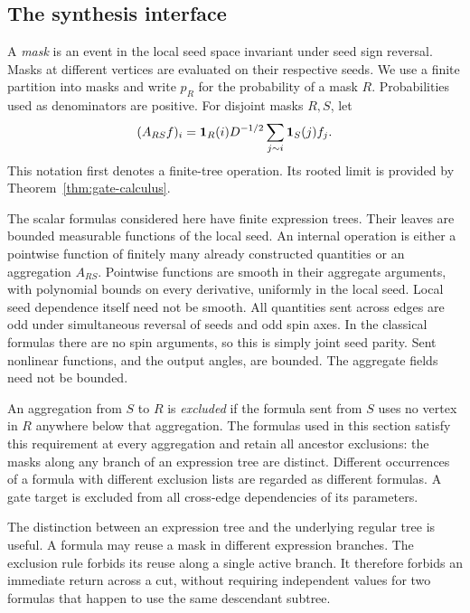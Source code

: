 \subsection{The synthesis interface}

A \emph{mask} is an event in the local seed space invariant under seed
sign reversal.  Masks at different vertices are evaluated on their
respective seeds.  We use a finite partition into masks and write
\(p_R\) for the probability of a mask \(R\).  Probabilities used as
denominators are positive.  For disjoint masks \(R,S\), let
\[
 (A_{RS}f)_i=\mathbf 1_R(i)D^{-1/2}
       \sum_{j\sim i}\mathbf 1_S(j)f_j .
\]
This notation first denotes a finite-tree operation.  Its rooted limit
is provided by Theorem~\ref{thm:gate-calculus}.

The scalar formulas considered here have finite expression trees.
Their leaves are bounded measurable functions of the local seed.
An internal operation is either a pointwise function of finitely many
already constructed quantities or an aggregation \(A_{RS}\).
Pointwise functions are smooth in their aggregate arguments, with
polynomial bounds on every derivative, uniformly in the local seed.
Local seed dependence itself need not be smooth.  All quantities sent
across edges are odd under simultaneous reversal of seeds and odd spin
axes.  In the classical formulas there are no spin arguments, so this
is simply joint seed parity.  Sent nonlinear functions, and the output
angles, are bounded.  The aggregate fields need not be bounded.

\begin{definition}
\label{def:exclusion-formulas}
An aggregation from \(S\) to \(R\) is \emph{excluded} if the formula
sent from \(S\) uses no vertex in \(R\) anywhere below that
aggregation.  The formulas used in this section satisfy this
requirement at every aggregation and retain all ancestor exclusions:
the masks along any branch of an expression tree are distinct.
Different occurrences of a formula with different exclusion lists are
regarded as different formulas.  A gate target is excluded from all
cross-edge dependencies of its parameters.
\end{definition}

The distinction between an expression tree and the underlying regular
tree is useful.  A formula may reuse a mask in different expression
branches.  The exclusion rule forbids its reuse along a single active
branch.  It therefore forbids an immediate return across a cut, without
requiring independent values for two formulas that happen to use the
same descendant subtree.

